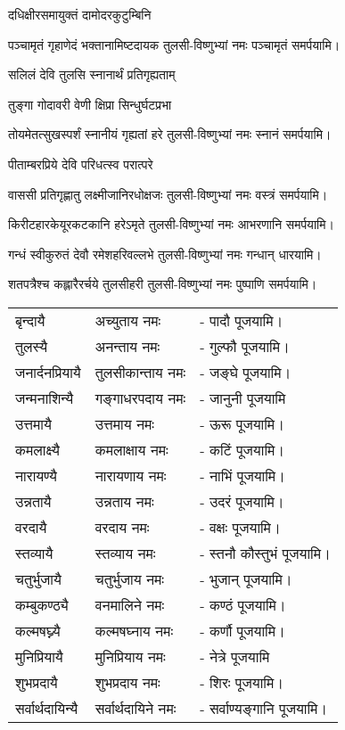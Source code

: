 \begin{center}
{दधिक्षीरसमायुक्तं दामोदरकुटुम्बिनि}

{पञ्चामृतं गृहाणेदं भक्तानामिष्टदायक}
\hfill{}तुलसी-विष्णुभ्यां नमः पञ्चामृतं समर्पयामि।

{सलिलं देवि तुलसि स्नानार्थं प्रतिगृह्यताम्}

{तुङ्गा गोदावरी वेणी क्षिप्रा सिन्धुर्घटप्रभा}

{तोयमेतत्सुखस्पर्शं स्नानीयं गृह्यतां हरे}
\hfill{}तुलसी-विष्णुभ्यां नमः स्नानं समर्पयामि।

{पीताम्बरप्रिये देवि परिधत्स्व परात्परे}

{वाससी प्रतिगृह्णातु लक्ष्मीजानिरधोक्षजः}
\hfill{}तुलसी-विष्णुभ्यां नमः वस्त्रं समर्पयामि।

{किरीटहारकेयूरकटकानि हरेऽमृते}
\hfill{}तुलसी-विष्णुभ्यां नमः आभरणानि समर्पयामि।

{गन्धं स्वीकुरुतं देवौ रमेशहरिवल्लभे}
\hfill{}तुलसी-विष्णुभ्यां नमः गन्धान् धारयामि।

{शतपत्रैश्च कह्लारैरर्चये तुलसीहरी}
\hfill{}तुलसी-विष्णुभ्यां नमः पुष्पाणि समर्पयामि।
\end{center}



\begin{tabular}{ll@{}l}
बृन्दायै &  अच्युताय नमः & - पादौ पूजयामि।\\
तुलस्यै & अनन्ताय   नमः  &- गुल्फौ पूजयामि।\\
जनार्दनप्रियायै &  तुलसीकान्ताय नमः & - जङ्घे पूजयामि।\\
जन्मनाशिन्यै &  गङ्गाधरपदाय नमः & - जानुनी पूजयामि \\
उत्तमायै &  उत्तमाय नमः & - ऊरू पूजयामि।\\
कमलाक्ष्यै &  कमलाक्षाय नमः & - कटिं पूजयामि।\\
नारायण्यै &  नारायणाय नमः & - नाभिं पूजयामि।\\
उन्नतायै &  उन्नताय नमः & - उदरं पूजयामि।\\
वरदायै &  वरदाय नमः & - वक्षः पूजयामि।\\
स्तव्यायै &  स्तव्याय नमः & - स्तनौ कौस्तुभं पूजयामि।\\
चतुर्भुजायै &  चतुर्भुजाय नमः & - भुजान् पूजयामि।\\
कम्बुकण्ठ्यै &  वनमालिने नमः & - कण्ठं पूजयामि।\\
कल्मषघ्न्यै &  कल्मषघ्नाय नमः & - कर्णौ पूजयामि।\\
मुनिप्रियायै &  मुनिप्रियाय नमः & - नेत्रे पूजयामि\\
शुभप्रदायै &  शुभप्रदाय नमः & - शिरः पूजयामि।\\
सर्वार्थदायिन्यै &  सर्वार्थदायिने नमः & - सर्वाण्यङ्गानि पूजयामि। \\
\end{tabular}


